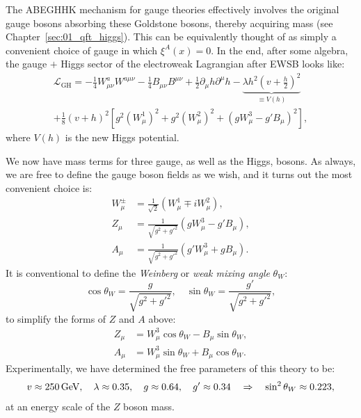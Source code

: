 The ABEGHHK mechanism for gauge theories effectively involves the original gauge bosons absorbing these Goldstone bosons, thereby acquiring mass (see Chapter~\ref{sec:01_qft_higgs}).
This can be equivalently thought of as simply a convenient choice of gauge in which $\xi^A(x) = 0$.
In the end, after some algebra, the gauge $+$ Higgs sector of the electroweak Lagrangian after EWSB looks like:
\begin{multline}
	\label{eq:01_sm_ew_gauge_lagrangian}
	\mathcal{L}_\mathrm{GH} = -\frac{1}{4} W^a_{\mu\nu} W^{a\mu\nu} - \frac{1}{4} B_{\mu\nu} B^{\mu\nu} + \frac{1}{2}\partial_\mu h \partial^\mu h - \underbrace{\lambda h^2 \left(v + \frac{h}{2}\right)^2}_{\equiv V(h)} \\
	+ \frac{1}{8} (v + h)^2 \left[g^2 (W^1_\mu)^2 + g^2 (W^2_\mu)^2 + (g W^3_\mu - g' B_\mu)^2\right],
\end{multline}
where $V(h)$ is the new Higgs potential.

We now have mass terms for three gauge, as well as the Higgs, bosons.
As always, we are free to define the gauge boson fields as we wish, and it turns out the most convenient choice is:
\begin{equation}
	\label{eq:01_sm_ew_gauge_fields}
	\begin{split}
		W^\pm_\mu &= \frac{1}{\sqrt{2}} (W^1_\mu \mp i W^2_\mu), \\
		Z_\mu &= \frac{1}{\sqrt{g^2 + g'^2}} (g W^3_\mu - g' B_\mu), \\
		A_\mu &= \frac{1}{\sqrt{g^2 + g'^2}} (g' W^3_\mu + g B_\mu).
	\end{split}
\end{equation}
It is conventional to define the \textit{Weinberg} or \textit{weak mixing angle} $\theta_W$:
\begin{equation}
	\label{eq:01_sm_ew_weinberg}
	\cos \theta_W = \frac{g}{\sqrt{g^2 + g'^2}}, \quad \sin \theta_W = \frac{g'}{\sqrt{g^2 + g'^2}},
\end{equation}
to simplify the forms of $Z$ and $A$ above:
\begin{equation}
	\label{eq:01_sm_ew_z_a}
	\begin{split}
		Z_\mu &= W^3_\mu \cos \theta_W - B_\mu \sin \theta_W, \\
		A_\mu &= W^3_\mu \sin \theta_W + B_\mu \cos \theta_W.
	\end{split}
\end{equation}
Experimentally, we have determined the free parameters of this theory to be:
\begin{equation}
	\label{eq:01_sm_ew_constants}
		v \approx 250\,\text{Ge\hspace{-.08em}V}, \quad \lambda \approx 0.35, \quad g \approx 0.64, \quad g' \approx 0.34 \quad \Rightarrow \quad \sin^2 \theta_W \approx 0.223,
\end{equation}
at an energy scale of the $Z$ boson mass.

